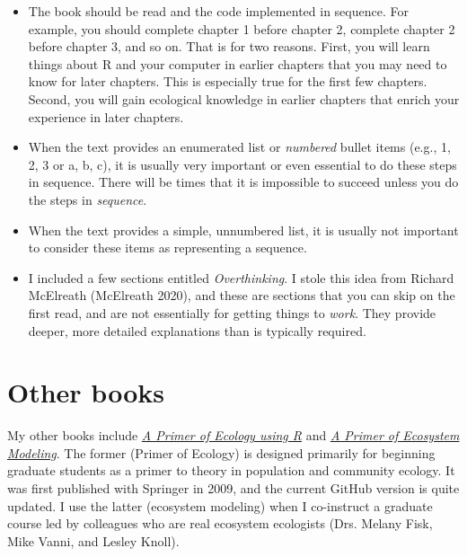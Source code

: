 \documentclass[
  letterpaper,
  DIV=11,
  numbers=noendperiod]{scrreprt}
\providecommand{\tightlist}{%
  \setlength{\itemsep}{0pt}\setlength{\parskip}{0pt}}
\begin{document}
\begin{itemize}
\tightlist
\item
  The book should be read and the code implemented in sequence. For
  example, you should complete chapter 1 before chapter 2, complete
  chapter 2 before chapter 3, and so on. That is for two reasons. First,
  you will learn things about R and your computer in earlier chapters
  that you may need to know for later chapters. This is especially true
  for the first few chapters. Second, you will gain ecological knowledge
  in earlier chapters that enrich your experience in later chapters.
\item
  When the text provides an enumerated list or \emph{numbered} bullet
  items (e.g., 1, 2, 3 or a, b, c), it is usually very important or even
  essential to do these steps in sequence. There will be times that it
  is impossible to succeed unless you do the steps in \emph{sequence}.
\item
  When the text provides a simple, unnumbered list, it is usually not
  important to consider these items as representing a sequence.
\item
  I included a few sections entitled \emph{Overthinking}. I stole this
  idea from Richard McElreath (McElreath 2020), and these are sections
  that you can skip on the first read, and are not essentially for
  getting things to \emph{work}. They provide deeper, more detailed
  explanations than is typically required.
\end{itemize}

\section*{Other books}\label{other-books}


My other books include
\href{https://hankstevens.github.io/Primer-of-Ecology/}{\emph{A Primer
of Ecology using R}} and
\href{https://hankstevens.github.io/ecosystems-primer/}{\emph{A Primer
of Ecosystem Modeling}}. The former (Primer of Ecology) is designed
primarily for beginning graduate students as a primer to theory in
population and community ecology. It was first published with Springer
in 2009, and the current GitHub version is quite updated. I use the
latter (ecosystem modeling) when I co-instruct a graduate course led by
colleagues who are real ecosystem ecologists (Drs. Melany Fisk, Mike
Vanni, and Lesley Knoll).
\end{document}
